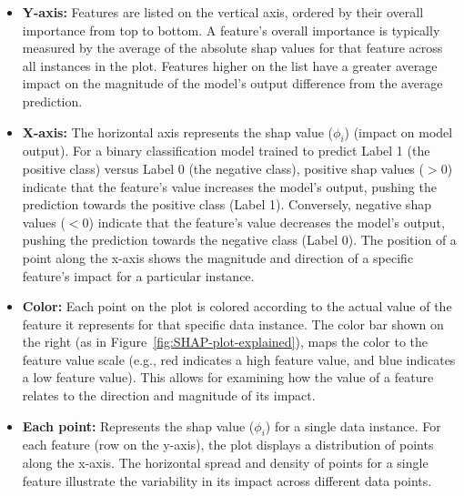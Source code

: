 \documentclass[12pt,a4paper]{report}
\begin{document}
\begin{itemize}
    \item \textbf{Y-axis:} Features are listed on the vertical axis, ordered by their overall importance from top to bottom. A feature's overall importance is typically measured by the average of the absolute \gls{shap} values for that feature across all instances in the plot. Features higher on the list have a greater average impact on the magnitude of the model's output difference from the average prediction.
    \item \textbf{X-axis:} The horizontal axis represents the \gls{shap} value ($\phi_i$) (impact on model output). For a binary classification model trained to predict Label 1 (the positive class) versus Label 0 (the negative class), positive \gls{shap} values ($>0$) indicate that the feature's value increases the model's output, pushing the prediction towards the positive class (Label 1). Conversely, negative \gls{shap} values ($<0$) indicate that the feature's value decreases the model's output, pushing the prediction towards the negative class (Label 0). The position of a point along the x-axis shows the magnitude and direction of a specific feature's impact for a particular instance.
    \item \textbf{Color:} Each point on the plot is colored according to the actual value of the feature it represents for that specific data instance. The color bar shown on the right (as in Figure~\ref{fig:SHAP-plot-explained}), maps the color to the feature value scale (e.g., red indicates a high feature value, and blue indicates a low feature value). This allows for examining how the value of a feature relates to the direction and magnitude of its impact.
    \item \textbf{Each point:} Represents the \gls{shap} value ($\phi_i$) for a single data instance. For each feature (row on the y-axis), the plot displays a distribution of points along the x-axis. The horizontal spread and density of points for a single feature illustrate the variability in its impact across different data points.
\end{itemize}
\end{document}
